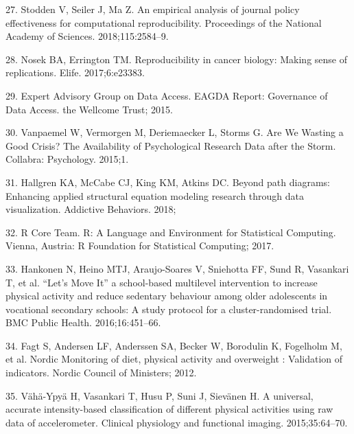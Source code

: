 \documentclass[english,man,floatsintext]{apa6}
\begin{document}
\leavevmode\hypertarget{ref-stoddenEmpiricalAnalysisJournal2018}{}%
27. Stodden V, Seiler J, Ma Z. An empirical analysis of journal policy effectiveness for computational reproducibility. Proceedings of the National Academy of Sciences. 2018;115:2584--9.

\leavevmode\hypertarget{ref-nosekReproducibilityCancerBiology2017}{}%
28. Nosek BA, Errington TM. Reproducibility in cancer biology: Making sense of replications. Elife. 2017;6:e23383.

\leavevmode\hypertarget{ref-expertadvisorygroupondataaccessEAGDAReportGovernance2015}{}%
29. Expert Advisory Group on Data Access. EAGDA Report: Governance of Data Access. the Wellcome Trust; 2015.

\leavevmode\hypertarget{ref-vanpaemelAreWeWasting2015}{}%
30. Vanpaemel W, Vermorgen M, Deriemaecker L, Storms G. Are We Wasting a Good Crisis? The Availability of Psychological Research Data after the Storm. Collabra: Psychology. 2015;1.

\leavevmode\hypertarget{ref-hallgrenPathDiagramsEnhancing2018}{}%
31. Hallgren KA, McCabe CJ, King KM, Atkins DC. Beyond path diagrams: Enhancing applied structural equation modeling research through data visualization. Addictive Behaviors. 2018;

\leavevmode\hypertarget{ref-rcoreteamLanguageEnvironmentStatistical2017}{}%
32. R Core Team. R: A Language and Environment for Statistical Computing. Vienna, Austria: R Foundation for Statistical Computing; 2017.

\leavevmode\hypertarget{ref-hankonenLetMoveIt2016}{}%
33. Hankonen N, Heino MTJ, Araujo-Soares V, Sniehotta FF, Sund R, Vasankari T, et al. ``Let's Move It'' a school-based multilevel intervention to increase physical activity and reduce sedentary behaviour among older adolescents in vocational secondary schools: A study protocol for a cluster-randomised trial. BMC Public Health. 2016;16:451--66.

\leavevmode\hypertarget{ref-fagtNordicMonitoringDiet2012}{}%
34. Fagt S, Andersen LF, Anderssen SA, Becker W, Borodulin K, Fogelholm M, et al. Nordic Monitoring of diet, physical activity and overweight : Validation of indicators. Nordic Council of Ministers; 2012.

\leavevmode\hypertarget{ref-vaha-ypyaUniversalAccurateIntensitybased2015}{}%
35. Vähä-Ypyä H, Vasankari T, Husu P, Suni J, Sievänen H. A universal, accurate intensity-based classification of different physical activities using raw data of accelerometer. Clinical physiology and functional imaging. 2015;35:64--70.
\end{document}
